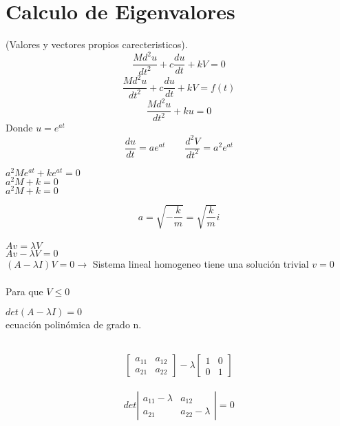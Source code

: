 \chapter{Calculo de Eigenvalores}
(Valores y vectores propios carecteristicos).
\begin{displaymath}
\frac{Md^2u}{dt^2}+c\frac{du}{dt}+kV=0
\end{displaymath}
\begin{displaymath}
\frac{Md^2u}{dt^2}+c\frac{du}{dt}+kV=f(t)
\end{displaymath}
\begin{displaymath}
\frac{Md^2u}{dt^2}+ku=0
\end{displaymath}
Donde $u=e^{at}$
\begin{displaymath}
\frac{du}{dt}=ae^{at} \qquad \frac{d^2V}{dt^2}=a^2e^{at}
\end{displaymath}
\begin{center}
$a^2Me^{at}+ke^{at}=0$\\
$a^2M+k=0$\\
$a^2M+k=0$
\end{center}
\begin{displaymath}
a=\sqrt{-\frac{k}{m}}=\sqrt{\frac{k}{m}}i
\end{displaymath}
\\
$Av=\lambda V$\\
$Av-\lambda V=0$\\
$(A-\lambda I)V=0\rightarrow$ Sistema lineal homogeneo tiene una soluci\'on trivial $v=0$
\\
\\
Para que $V\leq 0$
\begin{center}
$det(A-\lambda I)=0$\\ecuaci\'on polin\'omica de grado n.
\end{center} \\
\begin{displaymath}
\begin{bmatrix}
a_{11} & a_{12} \\
a_{21} & a_{22}
\end{bmatrix}-\lambda \begin{bmatrix}
1 & 0 \\
0 & 1 
\end{bmatrix}
\end{displaymath}
\\
\begin{displaymath}
det\left| \begin{matrix}
a_{11}-\lambda & a_{12} \\
a_{21} & a_{22}-\lambda
\end{matrix}\right| =0
\end{displaymath}


 